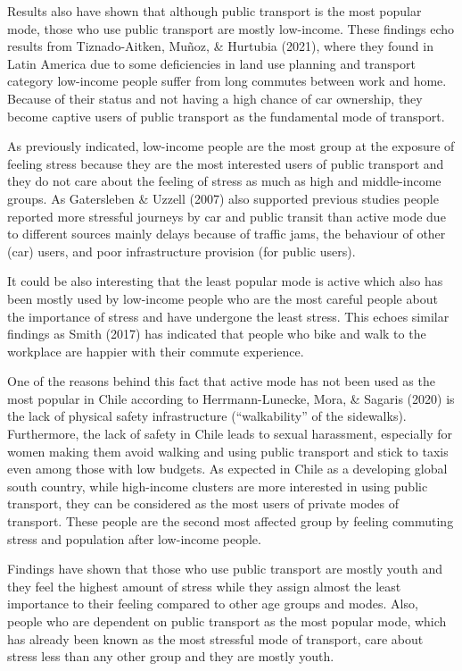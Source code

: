 \documentclass[
11pt, %
oneside, %
english, %
singlespacing, %
]{macthesis} %
\begin{document}
Results also have shown that although public transport is the most popular mode, those who use public transport are mostly low-income. These findings echo results from Tiznado-Aitken, Muñoz, \& Hurtubia (2021), where they found in Latin America due to some deficiencies in land use planning and transport category low-income people suffer from long commutes between work and home. Because of their status and not having a high chance of car ownership, they become captive users of public transport as the fundamental mode of transport.

As previously indicated, low-income people are the most group at the exposure of feeling stress because they are the most interested users of public transport and they do not care about the feeling of stress as much as high and middle-income groups. As Gatersleben \& Uzzell (2007) also supported previous studies people reported more stressful journeys by car and public transit than active mode due to different sources mainly delays because of traffic jams, the behaviour of other (car) users, and poor infrastructure provision (for public users).

It could be also interesting that the least popular mode is active which also has been mostly used by low-income people who are the most careful people about the importance of stress and have undergone the least stress. This echoes similar findings as Smith (2017) has indicated that people who bike and walk to the workplace are happier with their commute experience.

One of the reasons behind this fact that active mode has not been used as the most popular in Chile according to Herrmann-Lunecke, Mora, \& Sagaris (2020) is the lack of physical safety infrastructure (``walkability'' of the sidewalks). Furthermore, the lack of safety in Chile leads to sexual harassment, especially for women making them avoid walking and using public transport and stick to taxis even among those with low budgets.
As expected in Chile as a developing global south country, while high-income clusters are more interested in using public transport, they can be considered as the most users of private modes of transport. These people are the second most affected group by feeling commuting stress and population after low-income people.

Findings have shown that those who use public transport are mostly youth and they feel the highest amount of stress while they assign almost the least importance to their feeling compared to other age groups and modes. Also, people who are dependent on public transport as the most popular mode, which has already been known as the most stressful mode of transport, care about stress less than any other group and they are mostly youth.
\end{document}
